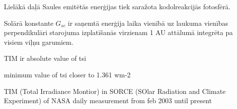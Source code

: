 
Lielākā daļā Saules emitētās enerģijas tiek saražota kodolreakcijās fotosfērā.

Solārā konstante $G_{sc}$ ir saņemtā enerģija laika vienībā uz laukuma vienības perpendikulāri starojuma izplatīšanās virzienam 1 AU attālumā integrēta pa visiem viļņu garumiem.\cite{ThermalProcesses}


TIM ir absolute value of tsi 


minimum value of tsi closer to 1.361 wm-2


TIM (Total Irradiance Montior) in SORCE (SOlar Radiation and Climate Experiment) of NASA 
daily measurement from feb 2003 until present
